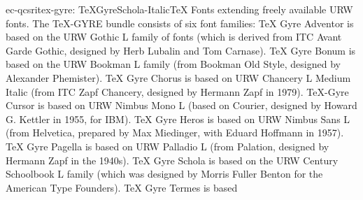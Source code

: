 \documentclass{ddltxtyp}
\begin{document}
\begin{package}{ec-qcsri}{tex-gyre: TeXGyreSchola-Italic}{{\TeX} Fonts extending freely available URW fonts.}
The {\TeX}-GYRE bundle consists of six font families: {\TeX} Gyre
Adventor is based on the URW Gothic L family of fonts (which is
derived from ITC Avant Garde Gothic, designed by Herb Lubalin
and Tom Carnase). {\TeX} Gyre Bonum is based on the URW Bookman L
family (from Bookman Old Style, designed by Alexander
Phemister). {\TeX} Gyre Chorus is based on URW Chancery L Medium
Italic (from ITC Zapf Chancery, designed by Hermann Zapf in
1979). {\TeX}-Gyre Cursor is based on URW Nimbus Mono L (based on
Courier, designed by Howard G. Kettler in 1955, for IBM). {\TeX}
Gyre Heros is based on URW Nimbus Sans L (from Helvetica,
prepared by Max Miedinger, with Eduard Hoffmann in 1957). {\TeX}
Gyre Pagella is based on URW Palladio L (from Palation,
designed by Hermann Zapf in the 1940s). {\TeX} Gyre Schola is
based on the URW Century Schoolbook L family (which was
designed by Morris Fuller Benton for the American Type
Founders). {\TeX} Gyre Termes is based %
\end{package}
\end{document}
